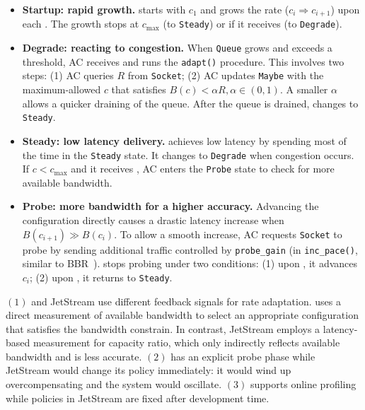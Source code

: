 \begin{itemize}[leftmargin=*, topsep=3pt, itemsep=0pt]

\item \textbf{Startup: rapid growth.} \sysname{} starts with $c_1$ and grows the
  rate ($c_i \Rightarrow c_{i+1}$) upon each \qe{}. The growth stops at
  $c_{\max}$ (to \texttt{Steady}) or if it receives \qc{} (to \texttt{Degrade}).

\item \textbf{Degrade: reacting to congestion.} When \texttt{Queue} grows and
  exceeds a threshold, AC receives \qc{} and runs the \texttt{adapt()}
  procedure. This involves two steps: (1) AC queries $R$ from \texttt{Socket};
  (2) AC updates \texttt{Maybe} with the maximum-allowed $c$ that satisfies
  $B(c) < \alpha R, \alpha \in (0, 1)$. A smaller $\alpha$ allows a quicker
  draining of the queue. After the queue is drained, \sysname{} changes to
  \texttt{Steady}.

\item \textbf{Steady: low latency delivery.} \sysname{} achieves low latency by
  spending most of the time in the \texttt{Steady} state. It changes to
  \texttt{Degrade} when congestion occurs. If $c < c_{\max}$ and it receives
  \qe{}, AC enters the \texttt{Probe} state to check for more available
  bandwidth.

\item \textbf{Probe: more bandwidth for a higher accuracy.} Advancing the configuration
  directly causes a drastic latency increase when $B(c_{i+1}) \gg B(c_i)$. To
  allow a smooth increase, AC requests \texttt{Socket} to probe by sending
  additional traffic controlled by \texttt{probe\_gain} (in
  \texttt{inc\_pace()}, similar to BBR~\cite{cardwell2017bbr}). \sysname{} stops
  probing under two conditions: (1) upon \spd{}, it advances $c_i$; (2) upon
  \qc{}, it returns to \texttt{Steady}.

\end{itemize}

 $(1)$ \sysname{} and JetStream use different
feedback signals for rate adaptation. \sysname{} uses a direct measurement of
available bandwidth to select an appropriate configuration that satisfies the
bandwidth constrain. In contrast, JetStream employs a latency-based measurement
for capacity ratio, which only indirectly reflects available bandwidth and is
less accurate. $(2)$ \sysname{} has an explicit probe phase while JetStream
would change its policy immediately: it would wind up overcompensating and the
system would oscillate. $(3)$ \sysname{} supports online profiling while
policies in JetStream are fixed after development time.

